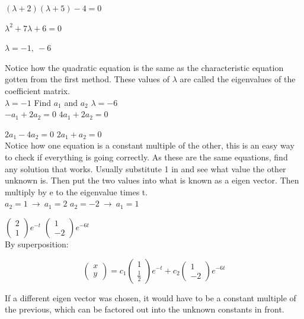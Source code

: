 \documentclass[12pt]{article}
\numberwithin{equation}{subsection}
\newcommand{\inda}{\hspace{.5cm}}
\newcommand{\indc}{\hspace{1.5cm}}
\newcommand{\indd}{\hspace{2cm}}
\newcommand{\inde}{\hspace{2.5cm}}
\newcommand{\indg}{\hspace{3.5cm}}
\newcommand{\indi}{\hspace{4.5cm}}
\newcommand{\indk}{\hspace{5.5cm}}
\newcommand{\indl}{\hspace{6cm}}
\begin{document}
\indd $(\lambda +2)(\lambda +5 )-4=0$

\indd $\lambda^2 +7\lambda +6=0$

\indd $\lambda=-1, \ -6$

Notice how the quadratic equation is the same as the characteristic equation gotten from the first method. These values of $\lambda$ are called the eigenvalues of the coefficient matrix.\\

\indd $\lambda=-1$ \inda Find $a_1$ and $a_2$ \indg $\lambda=-6$\\

\indc $-a_1+2a_2=0$ \indk $4a_1+2a_2=0$

\indc $2a_1-4a_2=0$ \indk $2a_1+a_2=0$\\

Notice how one equation is a constant multiple of the other, this is an easy way to check if everything is going correctly. As these are the same equations, find any solution that works. Usually substitute 1 in and see what value the other unknown is. Then put the two values into what is known as a eigen vector. Then multiply by e to the eigenvalue times t.\\

\indc $a_2=1 \ \rightarrow \ a_1=2$ \indi $a_2=-2\ \rightarrow \ a_1=1$

\inde $\begin{pmatrix}
2 \\
1
\end{pmatrix}e^{-t}$ \indl $\begin{pmatrix}
1 \\
-2
\end{pmatrix}e^{-6t}$\\

By superposition:

$$\begin{pmatrix}
x \\
y
\end{pmatrix}=c_1\begin{pmatrix}
1 \\
\frac{1}{2}
\end{pmatrix}e^{-t}+c_2\begin{pmatrix}
1 \\
-2
\end{pmatrix}e^{-6t} $$

If a different eigen vector was chosen, it would have to be a constant multiple of the previous, which can be factored out into the unknown constants in front.  
\end{document}
